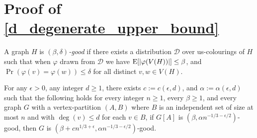\documentclass[kpfonts]{patmorin}
\newcommand{\defin}[1]{\emph{\color{brightmaroon}#1}}
\begin{document}
\section{Proof of \cref{d_degenerate_upper_bound}}

A graph $H$ is \defin{$(\beta,\delta)$-good} if there exists a distribution $\mathcal{D}$ over us-colourings of $H$ such that when $\varphi$ drawn from $\mathcal{D}$ we have
$\mathrm{E}[|\varphi(V(H))|]\le \beta$, and $\Pr(\varphi(v)=\varphi(w))\le\delta$ for all distinct $v,w\in V(H)$.


\begin{lem}
  For any $\epsilon >0$, any integer $d\ge 1$, there exists $c:=c(\epsilon,d)$, and $\alpha:=\alpha(\epsilon,d)$ such that the following holds for every integer $n\ge 1$, every $\beta \ge 1$, and every graph $G$ with a vertex-partition $(A,B)$ where $B$ is an independent set of size at most $n$ and with $\deg(v)\le d$ for each $v\in B$,  if $G[A]$ is $(\beta,\alpha n^{-1/3-\epsilon/2})$-good, then  $G$ is $(\beta+cn^{1/3+\epsilon},\alpha n^{-1/3-\epsilon/2})$-good.
\end{lem}
\end{document}

